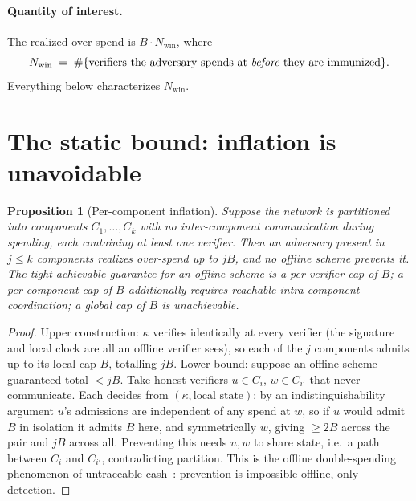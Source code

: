 \documentclass[11pt]{article}
\theoremstyle{plain}
\newtheorem{proposition}{Proposition}
\theoremstyle{definition}
\newcommand{\Nwin}{N_{\mathrm{win}}}
\begin{document}
\paragraph{Quantity of interest.} The realized over-spend is $B\cdot\Nwin$, where
\[
\Nwin \;=\; \#\{\text{verifiers the adversary spends at \emph{before} they are immunized}\}.
\]
Everything below characterizes $\Nwin$.

\section{The static bound: inflation is unavoidable}\label{sec:static}

\begin{proposition}[Per-component inflation]\label{prop:inflation}
Suppose the network is partitioned into components $C_1,\dots,C_k$ with no
inter-component communication during spending, each containing at least one
verifier. Then an adversary present in $j\le k$ components realizes over-spend up
to $jB$, and no offline scheme prevents it. The tight achievable guarantee for an
offline scheme is a per-verifier cap of $B$; a per-component cap of $B$ additionally
requires reachable intra-component coordination; a global cap of $B$ is
unachievable.
\end{proposition}

\begin{proof}
Upper construction: $\kappa$ verifies identically at every verifier (the signature
and local clock are all an offline verifier sees), so each of the $j$ components
admits up to its local cap $B$, totalling $jB$. Lower bound: suppose an offline
scheme guaranteed total $<jB$. Take honest verifiers $u\in C_i$, $w\in C_{i'}$ that
never communicate. Each decides from $(\kappa,\text{local state})$; by an
indistinguishability argument $u$'s admissions are independent of any spend at $w$,
so if $u$ would admit $B$ in isolation it admits $B$ here, and symmetrically $w$,
giving $\ge 2B$ across the pair and $jB$ across all. Preventing this needs $u,w$ to
share state, i.e.\ a path between $C_i$ and $C_{i'}$, contradicting partition. This
is the offline double-spending phenomenon of untraceable
cash~\cite{ChaumFiatNaor1988}: prevention is impossible offline, only detection.
\end{proof}
\end{document}
